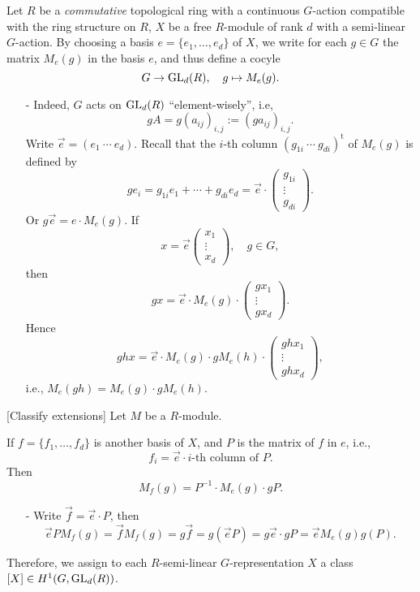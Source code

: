 \begin{example}
    Let $R$ be a \textit{commutative} topological ring with a continuous $G$-action compatible with the ring structure on $R$,
    $X$ be a free $R$-module of rank $d$ with a semi-linear $G$-action.
By choosing a basis $e = \{e_1, \dots, e_d\}$ of $X$,
we write for each $g\in G$ the matrix $M_e(g)$ in the basis $e$, and thus define a cocyle \[G\to\operatorname{GL}_d(R),\quad g\mapsto M_e(g).\]
\begin{itemize}
\item[-]Indeed, $G$ acts on $\operatorname{GL}_d(R)$ ``element-wisely'', i.e, \[gA = g (a_{ij})_{i, j} := (ga_{ij})_{i, j}.\]
Write \(\vec{e} = (e_1\ \cdots\ e_d) \).
Recall that the $i$-th column $(g_{1i}\ \cdots\ g_{di})^{\mathrm t}$ of $M_e(g)$ is defined by
\[ge_i = g_{1i}e_1 + \cdots + g_{di}e_d = \vec e
\cdot \begin{pmatrix}
    g_{1i}\\ \vdots \\ g_{di}
\end{pmatrix}.\]
Or $g\vec{e} = e\cdot M_e(g)$.
If \[x = \vec{e}\begin{pmatrix}
    x_1\\ \vdots\\ x_d
\end{pmatrix},\quad g\in G,\]
then \[gx =\vec{e} \cdot M_e(g)\cdot \begin{pmatrix}
    gx_1\\ \vdots \\ gx_d
\end{pmatrix}.\]
Hence \[ghx = \vec{e}\cdot M_e(g)\cdot gM_e(h)\cdot\begin{pmatrix}
    ghx_1\\ \vdots\\ ghx_d
\end{pmatrix},\]
i.e., $M_e(gh) = M_e(g)\cdot gM_e(h)$.

\end{itemize}[Classify extensions]
Let $M$ be a $R$-module.


If $f = \{f_1, \dots, f_d\}$ is another basis of $X$,
and $P$ is the matrix of $f$ in $e$, i.e., \[f_i = \vec{e}\cdot i\text{-th column of }P.
\]
Then \[M_f(g) = P^{-1}\cdot M_e(g)\cdot gP.\]
\begin{itemize}
\item[-]
Write $\vec{f} = \vec{e}\cdot P$,
then \[\vec{e}PM_f(g) =\vec{f}M_f(g) = g\vec{f} = g(\vec{e}P) = g\vec{e}\cdot gP = \vec{e}M_e(g)g(P).\]
\end{itemize}
Therefore, we assign to each $R$-semi-linear $G$-representation $X$ a class $[X]\in H^1(G, \operatorname{GL}_d(R))$.
\end{example}


